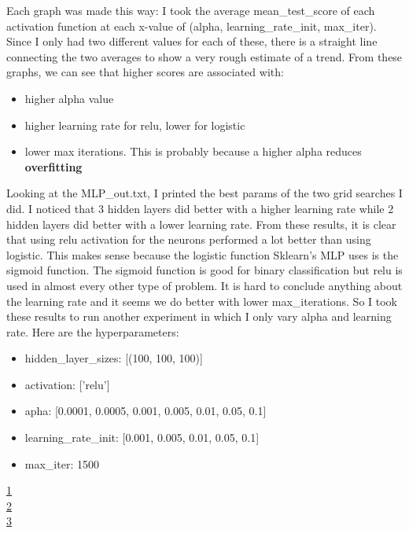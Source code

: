 \documentclass[12pt]{article}
\newcommand{\nextproblem}{
	\vfill
	\pagebreak
}
\begin{document}
Each graph was made this way: I took the average mean\_test\_score of each activation function at each x-value of (alpha, learning\_rate\_init, max\_iter). Since I only had two different values for each of these, there is a straight line connecting the two averages to show a very rough estimate of a trend. From these graphs, we can see that higher scores are associated with:
\begin{itemize}
    \item higher alpha value
    \item higher learning rate for relu, lower for logistic
    \item lower max iterations. This is probably because a higher alpha reduces \textbf{overfitting}
\end{itemize}
Looking at the MLP\_out.txt, I printed the best params of the two grid searches I did. I noticed that 3 hidden layers did better with a higher learning rate while 2 hidden layers did better with a lower learning rate. From these results, it is clear that using relu activation for the neurons performed a lot better than using logistic. This makes sense because the logistic function Sklearn's MLP uses is the sigmoid function. The sigmoid function is good for binary classification but relu is used in almost every other type of problem. It is hard to conclude anything about the learning rate and it seems we do better with lower max\_iterations. So I took these results to run another experiment in which I only vary alpha and learning rate. Here are the hyperparameters:
\begin{itemize}
    \item hidden\_layer\_sizes: [(100, 100, 100)]
    \item activation: ['relu']
    \item apha: [0.0001, 0.0005, 0.001, 0.005, 0.01, 0.05, 0.1]
    \item learning\_rate\_init: [0.001, 0.005, 0.01, 0.05, 0.1]
    \item max\_iter: 1500
\end{itemize}


\nextproblem

\href{https://www.quora.com/What-are-C-and-gamma-with-regards-to-a-support-vector-machine}{1} \\
\href{https://scikit-learn.org/stable/auto_examples/svm/plot_rbf_parameters.html}{2} \\
\href{https://machinelearningmastery.com/save-load-machine-learning-models-python-scikit-learn/}{3} \\
\end{document}
